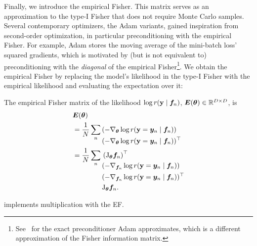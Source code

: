 Finally, we introduce the empirical Fisher.
This matrix serves as an approximation to the type-I Fisher that does not require Monte Carlo samples.
Several contemporary optimizers, \eg the Adam variants, gained inspiration from second-order optimization, in particular preconditioning with the empirical Fisher.
For example, Adam \cite{kingma2015adam} stores the moving average of the mini-batch loss' squared gradients, which is motivated by (but is not equivalent to) preconditioning with the \emph{diagonal} of the empirical Fisher\footnote{See~\citet{lin2024can} for the exact preconditioner Adam approximates, which is a different approximation of the Fisher information matrix.}.
We obtain the empirical Fisher by replacing the model's likelihood in the type-I Fisher with the empirical likelihood and evaluating the expectation over it:

\begin{definition}\label{def:emp_fisher}%
  The empirical Fisher matrix of the likelihood $\log r({\mathbf{y}} \mid {\bm{f}}_n)$,
  ${\bm{E}}({\bm{\theta}}) \in {\mathbb{R}}^{D \times D}$, is
  \begin{align*}
    & {\bm{E}}({\bm{\theta}}) \\
	& = \frac{1}{N} \sum_{n}
	\begin{aligned}[t]
	   & (-\nabla_{{\bm{\theta}}} \log r({\mathbf{y}} = {\bm{y}}_n \mid {\bm{f}}_n))        \\
	   & (-\nabla_{{\bm{\theta}}} \log r({\mathbf{y}} = {\bm{y}}_n \mid {\bm{f}}_n))^{\top} \\
	\end{aligned} \\
    & = \frac{1}{N} \sum_{n}
    \begin{aligned}[t]
       & \left(\mathrm{J}_{{\bm{\theta}}}{\bm{f}}_n\right)^{\top}                  \\
       & (-\nabla_{{\bm{f}}_n} \log r({\mathbf{y}} = {\bm{y}}_n \mid {\bm{f}}_n))        \\
       & (-\nabla_{{\bm{f}}_n} \log r({\mathbf{y}} = {\bm{y}}_n \mid {\bm{f}}_n))^{\top} \\
       & \mathrm{J}_{{\bm{\theta}}}{\bm{f}}_n.
    \end{aligned}
  \end{align*}
\end{definition}

\switchcolumn[1]
\switchcolumn[0]

 implements multiplication with the EF.

